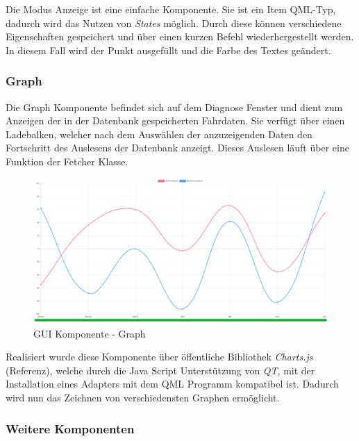 Die Modus Anzeige ist eine einfache Komponente. Sie ist ein Item QML-Typ, dadurch wird das Nutzen von \textit{States} möglich. Durch diese können verschiedene Eigenschaften gespeichert und über einen kurzen Befehl wiederhergestellt werden.\\
In diesem Fall wird der Punkt ausgefüllt und die Farbe des Textes geändert.

\newpage

\subsubsection{Graph} \label{sec:graph}

Die Graph Komponente befindet sich auf dem Diagnose Fenster und dient zum Anzeigen der in der Datenbank gespeicherten Fahrdaten. Sie verfügt über einen Ladebalken, welcher nach dem Auswählen der anzuzeigenden Daten den Fortschritt des Auslesens der Datenbank anzeigt. Dieses Auslesen läuft über eine Funktion der Fetcher Klasse.

\begin{figure}[H]
	\begin{center}
		\includegraphics[scale=0.3]{figures/hcis/component_graph.png}
		\caption{GUI Komponente - Graph}
				\label{fig:kompGraph}
	\end{center}
\end{figure}

Realisiert wurde diese Komponente über öffentliche Bibliothek \textit{Charts.js} (Referenz), welche durch die Java Script Unterstützung von \textit{QT}, mit der Installation eines Adapters mit dem QML Programm kompatibel ist. Dadurch wird nun das Zeichnen von verschiedensten Graphen ermöglicht.

\subsubsection{Weitere Komponenten}

